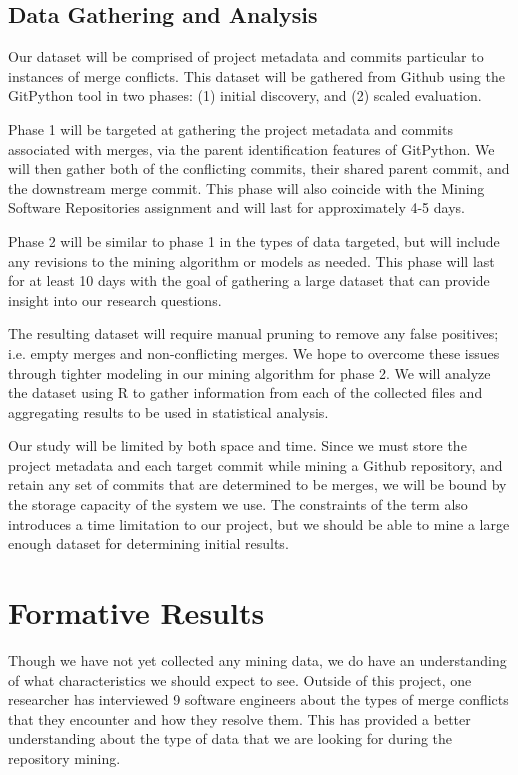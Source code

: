 \documentclass{sig-alternate-05-2015}
\begin{document}
\subsection{Data Gathering and Analysis}
Our dataset will be comprised of project metadata and commits particular to instances of merge conflicts. This dataset will be gathered from Github using the GitPython tool in two phases: (1) initial discovery, and (2) scaled evaluation.

Phase 1 will be targeted at gathering the project metadata and commits associated with merges, via the parent identification features of GitPython. We will then gather both of the conflicting commits, their shared parent commit, and the downstream merge commit. This phase will also coincide with the Mining Software Repositories assignment and will last for approximately 4-5 days.

Phase 2 will be similar to phase 1 in the types of data targeted, but will include any revisions to the mining algorithm or models as needed. This phase will last for at least 10 days with the goal of gathering a large dataset that can provide insight into our research questions.

The resulting dataset will require manual pruning to remove any false positives; i.e. empty merges and non-conflicting merges. We hope to overcome these issues through tighter modeling in our mining algorithm for phase 2. We will analyze the dataset using R to gather information from each of the collected files and aggregating results to be used in statistical analysis.

Our study will be limited by both space and time. Since we must store the project metadata and each target commit while mining a Github repository, and retain any set of commits that are determined to be merges, we will be bound by the storage capacity of the system we use. The constraints of the term also introduces a time limitation to our project, but we should be able to mine a large enough dataset for determining initial results.

\section{Formative Results}\label{Results}
Though we have not yet collected any mining data, we do have an understanding of what characteristics we should expect to see. Outside of this project, one researcher has interviewed 9 software engineers about the types of merge conflicts that they encounter and how they resolve them. This has provided a better understanding about the type of data that we are looking for during the repository mining.

{}

\fi
\end{document}
